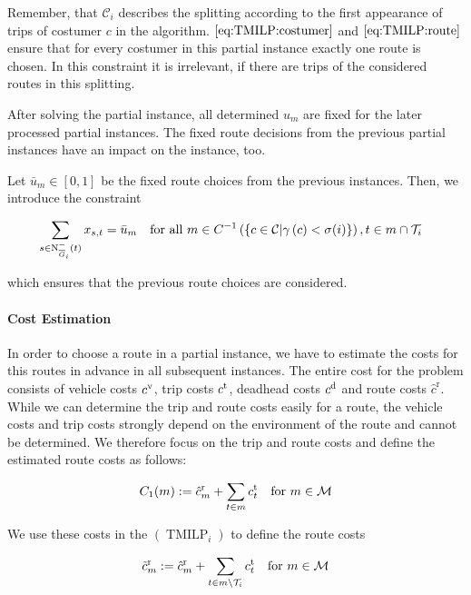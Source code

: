 Remember, that $\mathcal{C}_i$ describes the splitting according to the first appearance of trips of costumer $c$ in the algorithm. $\eqref{eq:TMILP:costumer}$ and $\eqref{eq:TMILP:route}$ ensure that for every costumer in this partial instance exactly one route is chosen. In this constraint it is irrelevant, if there are trips of the considered routes in this splitting. 

After solving the partial instance, all determined $u_m$ are fixed for the later processed partial instances. The fixed route decisions from the previous partial instances have an impact on the instance, too. 

Let $\bar{u}_m\in[0,1]$ be the fixed route choices from the previous instances. Then, we introduce the constraint

\begin{align}
	&\sum_{s\in\operatorname{N}_{\overline{G}_i}^-(t)} x_{s,t} = \bar{u}_m && \text{for all } m\in C^{-1}\left(\left\{c\in\mathcal{C}|\gamma\left(c\right)<\sigma(i)\right\}\right), t\in m\cap\mathcal{T}_i \label{eq:TMILP:route_fix}
\end{align}

which ensures that the previous route choices are considered.

\paragraph{Cost Estimation} \parfill

In order to choose a route in a partial instance, we have to estimate the costs for this routes in advance in all subsequent instances. The entire cost for the problem consists of vehicle costs $c^{\operatorname{v}}$, trip costs $c^{\operatorname{t}}$, deadhead costs $c^{\operatorname{d}}$ and route costs $\hat{c}^{\operatorname{r}}$. While we can determine the trip and route costs easily for a route, the vehicle costs and trip costs strongly depend on the environment of the route and cannot be determined. We therefore focus on the trip and route costs and define the estimated route costs as follows:

\begin{align}
\label{eq:estimated_route}
	C_1(m) := \hat{c}^{\operatorname{r}}_m + \sum_{t\in m}c^{\operatorname{t}}_t && \text{for } m\in\mathcal{M}
\end{align}

We use these costs in the $(\operatorname{TMILP}_i)$ to define the route costs

\begin{align}
	\tilde{c}^{\operatorname{r}}_m := \hat{c}^{\operatorname{r}}_m + \sum_{t\in m\backslash\mathcal{T}_i}c^{\operatorname{t}}_t && \text{for } m\in\mathcal{M}
\end{align}

